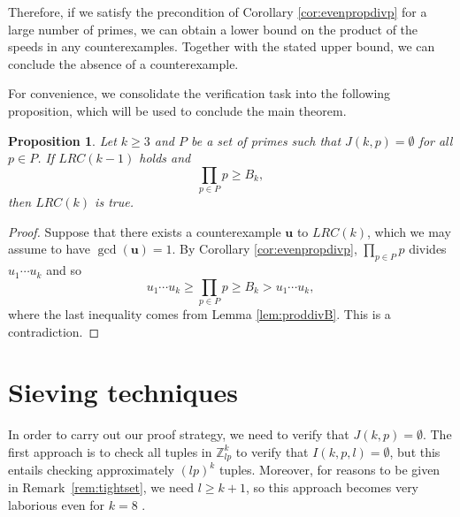 \documentclass[11pt]{amsart}
\newcommand{\Z}{\mathbb{Z}}
\newcommand{\ubf}{\mathbf{u}}
\newtheorem{proposition}[theorem]{Proposition}
\theoremstyle{definition}
\theoremstyle{remark}
\begin{document}
Therefore, if we satisfy the precondition of Corollary \ref{cor:evenpropdivp} for a large number of primes,
we can obtain a lower bound on the product of the speeds in any counterexamples. 
Together with the stated upper bound, we can conclude the absence of a counterexample.

For convenience, we consolidate the verification task into the following proposition,
which will be used to conclude the main theorem.
\begin{proposition}
\label{prop:verify}
  Let $k \ge 3$ and $P$ be a set of primes such that $J(k,p)=\emptyset$ for all $p\in P$. 
  If $LRC(k-1)$ holds and
  \[\prod_{p \in P} p\geq B_k,\] 
  then $LRC(k)$ is true.
\end{proposition}
\begin{proof}
    Suppose that there exists a counterexample $\ubf$ to $LRC(k)$, which we may assume to have $\gcd(\ubf)=1$. 
    By Corollary \ref{cor:evenpropdivp}, $\prod_{p\in P}p$ divides $u_1\cdots u_k$ and so 
    \[u_1\cdots u_k\geq \prod_{p \in P} p\geq B_k>u_1\cdots u_k,\] 
    where the last inequality comes from Lemma \ref{lem:proddivB}. 
    This is a contradiction.
\end{proof}

\section{Sieving techniques} \label{sec:sieves}
In order to carry out our proof strategy, we need to verify that $J(k,p)=\emptyset$. 
The first approach is to check all tuples in $\Z^{k}_{lp}$ to verify that $I(k,p,l)=\emptyset$,
but this entails checking approximately $(lp)^k$ tuples. 
Moreover, for reasons to be given in Remark~\ref{rem:tightset},
we need $l\geq k+1$, so this approach becomes very laborious even for $k=8$ \cite{rosenfeld2025lonely2}.
\end{document}
